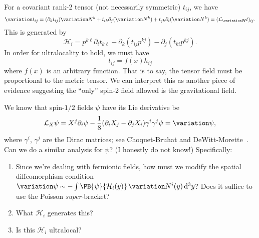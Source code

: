 For a covariant rank-2 tensor (not necessarily symmetric) $t_{ij}$, we
have
\begin{equation}
\variation t_{ij} = (\partial_{k}t_{ij})\variation N^{k}
+ t_{ik}\partial_{j}(\variation N^{k})
+ t_{jk}\partial_{i}(\variation N^{k})
= (\LieD_{\variation\vec{N}}t)_{ij}.
\end{equation}
This is generated by
\begin{equation}
\mathcal{H}_{i} = p^{k\ell}\partial_{i}t_{k\ell}-\partial_{k}(t_{ij}p^{kj})-\partial_{j}(t_{ki}p^{kj}).
\end{equation}
In order for ultralocality to hold, we must have
\begin{equation}
t_{ij} = f(x)h_{ij}
\end{equation}
where $f(x)$ is an arbitrary function. That is to say, the tensor field
must be proportional to the metric tensor. We can interpret this as
another piece of evidence suggesting the ``only'' spin-2 field allowed
is the gravitational field.

\begin{exercise}[Fermions]
We know that spin-$1/2$ fields $\psi$ have its Lie derivative be
\begin{equation}
\LieD_{X}\psi = X^{j}\partial_{i}\psi - \frac{1}{8}(\partial_{i}X_{j}-\partial_{j}X_{i})\gamma^{i}\gamma^{j}\psi = \variation\psi,
\end{equation}
where $\gamma^{i}$, $\gamma^{j}$ are the Dirac matrices; see
Choquet-Bruhat and DeWitt-Morette~\cite{Choquet-Bruhat:2000amp2}.
Can we do a similar analysis for $\psi$? (I honestly do not know!)
Specifically:
\begin{enumerate}
\item Since we're dealing with
  fermionic fields, how must we modify the spatial diffeomorphism
  condition
  $\variation\psi\sim-\int\PB{\psi}{\mathcal{H}_{i}(y)}\,\variation N^{i}(y)\,\D^{3}y$?
  Does it suffice to use the Poisson \emph{super}-bracket?
\item What $\mathcal{H}_{i}$ generates this? 
\item Is this $\mathcal{H}_{i}$ ultralocal?
\end{enumerate}
\end{exercise}

